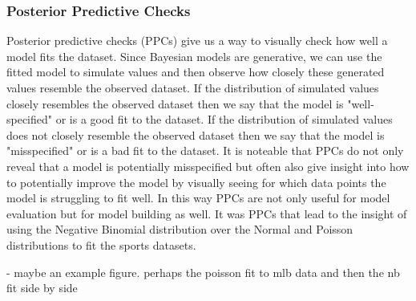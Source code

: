 \subsubsection{Posterior Predictive Checks}

Posterior predictive checks (PPCs) give us a way to visually check how well a model fits the dataset. Since Bayesian models are generative, we can use the fitted model to simulate values and then observe how closely these generated values resemble the observed dataset. If the distribution of simulated values closely resembles the observed dataset then we say that the model is "well-specified" or is a good fit to the dataset. If the distribution of simulated values does not closely resemble the observed dataset then we say that the model is "misspecified" or is a bad fit to the dataset. It is noteable that PPCs do not only reveal that a model is potentially misspecified but often also give insight into how to potentially improve the model by visually seeing for which data points the model is struggling to fit well. In this way PPCs are not only useful for model evaluation but for model building as well. It was PPCs that lead to the insight of using the Negative Binomial distribution over the Normal and Poisson distributions to fit the sports datasets.

- maybe an example figure. perhaps the poisson fit to mlb data and then the nb fit side by side
